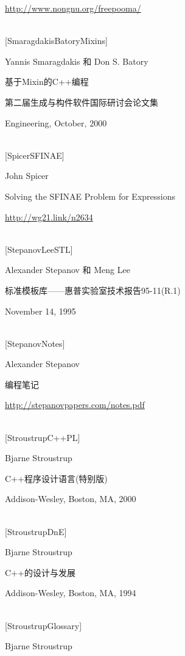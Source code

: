 \url{http://www.nongnu.org/freepooma/}


\hspace*{\fill} \\ %
{[SmaragdakisBatoryMixins]}

Yannis Smaragdakis 和 Don S. Batory

基于Mixin的C++编程

第二届生成与构件软件国际研讨会论文集

Engineering, October, 2000


\hspace*{\fill} \\ %
{[SpicerSFINAE]}

John Spicer

Solving the SFINAE Problem for Expressions

\url{http://wg21.link/n2634}

\hspace*{\fill} \\ %
{[StepanovLeeSTL]}

Alexander Stepanov 和 Meng Lee

标准模板库——惠普实验室技术报告95-11(R.1)

November 14, 1995

\hspace*{\fill} \\ %
{[StepanovNotes]}

Alexander Stepanov

编程笔记

\url{http://stepanovpapers.com/notes.pdf}

\hspace*{\fill} \\ %
{[StroustrupC++PL]}

Bjarne Stroustrup

C++程序设计语言(特别版)

Addison-Wesley, Boston, MA, 2000

\hspace*{\fill} \\ %
{[StroustrupDnE]}

Bjarne Stroustrup

C++的设计与发展

Addison-Wesley, Boston, MA, 1994

\hspace*{\fill} \\ %
{[StroustrupGlossary]}

Bjarne Stroustrup

